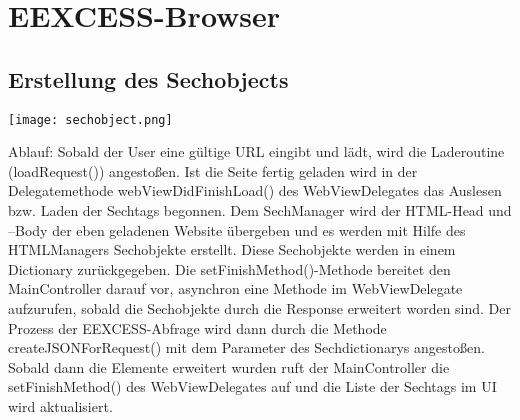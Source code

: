 \chapter{EEXCESS-Browser}

\section{Erstellung des Sechobjects}

\texttt{[image: sechobject.png]}

Ablauf:
Sobald der User eine gültige URL eingibt und lädt, wird die Laderoutine (loadRequest())
angestoßen. Ist die Seite fertig geladen wird in der Delegatemethode webViewDidFinishLoad()
des WebViewDelegates das Auslesen bzw. Laden der Sechtags begonnen.
Dem SechManager wird der HTML-Head und –Body der eben geladenen Website übergeben und es
werden mit Hilfe des HTMLManagers Sechobjekte erstellt. Diese Sechobjekte werden in einem
Dictionary zurückgegeben.
Die setFinishMethod()-Methode bereitet den MainController darauf vor, asynchron eine Methode
im WebViewDelegate aufzurufen, sobald die Sechobjekte durch die Response erweitert worden
sind. Der Prozess der EEXCESS-Abfrage wird dann durch die Methode createJSONForRequest() mit
dem Parameter des Sechdictionarys angestoßen. Sobald dann die Elemente erweitert wurden ruft
der MainController die setFinishMethod() des WebViewDelegates auf und die Liste der Sechtags
im UI wird aktualisiert.
